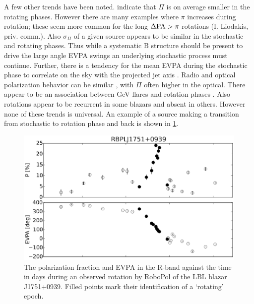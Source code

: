 A few other trends have been noted. \citet{blinov_robopol_2016} indicate that $\Pi$ is on average smaller in the rotating phases. However there are many examples where $\pi$ increases during rotation; these seem more common for the long $\Delta {\rm PA} > \pi$ rotations (I. Liodakis, priv. comm.). Also $\sigma_\Pi$ of a given source appears to be similar in the stochastic and rotating phases. Thus while a systematic B structure should be present to drive the large angle EVPA swings an underlying stochastic process must continue. Further, there is a tendency for the mean EVPA during the stochastic phase to correlate on the sky with the projected jet axis \citep{jorstad_multifrequency_2006}. Radio and optical polarization behavior can be similar \citep{darcangelo_synchronous_2009}, with $\Pi$ often higher in the optical. There appear to be an association between GeV flares and rotation phases \citep{blinov_robopol_2018}. Also rotations appear to be recurrent in some blazars and absent in others. However none of these trends is universal. An example of a source making a transition from stochastic to rotation phase and back is shown in \cref{fig:f1}.
\\  
\begin{figure}[t]
\label{fig:f1}
\includegraphics[width=0.8\linewidth]{figures/f1.eps}
\centering
\caption{The polarization fraction and EVPA in the R-band against the time in days during an observed rotation by RoboPol \citep{blinov_robopol_2016} of the LBL blazar J1751+0939. Filled points mark their identification of a `rotating' epoch.}
\end{figure}

